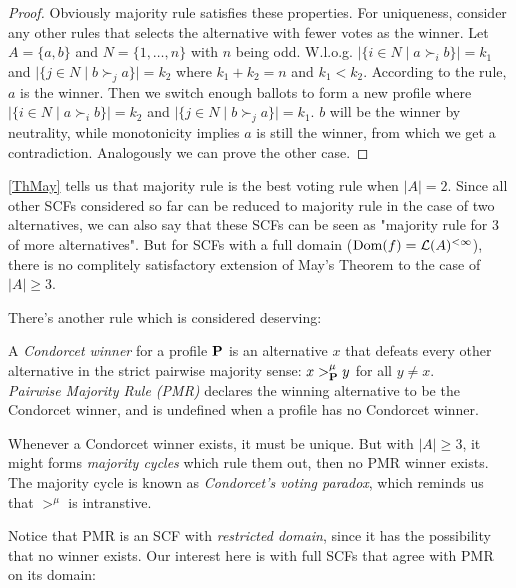 \begin{proof}
    Obviously majority rule satisfies these properties. For uniqueness, consider any other rules that selects the alternative with fewer votes as the winner. Let $A = \{a,b\}$ and $N = \{1,\dots,n\}$ with $n$ being odd. W.l.o.g. $|\{i \in N\;|\; a \succ_i b\}| = k_1$ and $|\{j \in N\;|\; b \succ_j a\}| = k_2$ where $k_1 + k_2 = n$ and $k_1 < k_2$. According to the rule, $a$ is the winner. Then we switch enough ballots to form a new profile where $|\{i \in N\;|\; a \succ_i b\}| = k_2$ and $|\{j \in N\;|\; b \succ_j a\}| = k_1$. $b$ will be the winner by neutrality, while monotonicity implies $a$ is still the winner, from which we get a contradiction. Analogously we can prove the other case.
\end{proof}

\cref{ThMay} tells us that majority rule is the best voting rule when $|A| = 2$. Since all other SCFs considered so far can be reduced to majority rule in the case of two alternatives, we can also say that these SCFs can be seen as "majority rule for 3 of more alternatives". But for SCFs with a full domain ($\mathrm{Dom}(f) = \mathcal{L}(A)^{<\infty}$), there is no complitely satisfactory extension of May's Theorem to the case of $|A| \geq 3$.

There's another rule which is considered deserving:

\begin{definition}
    A \textit{Condorcet winner} for a profile $\mathbf{P}$ is an alternative $x$ that defeats every other alternative in the strict pairwise majority sense: $x >^\mu_{\mathbf{P}} y$ for all $y \neq x$\footnotemark.\\
    \textit{Pairwise Majority Rule (PMR)} declares the winning alternative to be the Condorcet winner, and is undefined when a profile has no Condorcet winner.
\end{definition}

Whenever a Condorcet winner exists, it must be unique. But with $|A| \geq 3$, it might forms \textit{majority cycles} which rule them out, then no PMR winner exists. The majority cycle is known as \textit{Condorcet's voting paradox}, which reminds us that $>^\mu$ is intranstive.

Notice that PMR is an SCF with \textit{restricted domain}, since it has the possibility that no winner exists. Our interest here is with full SCFs that agree with PMR on its domain:

